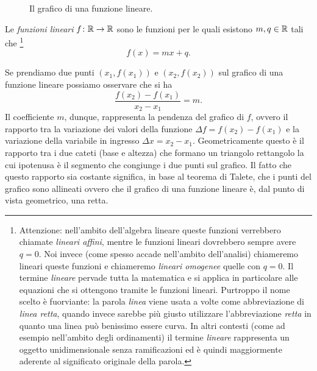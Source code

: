 \begin{figure}
  \begin{center}
  \end{center}
  \caption{Il grafico di una funzione lineare.}
  \label{fig:funzione_lineare}
\end{figure}

Le \emph{funzioni lineari}%
%
$f\colon {\mathbb R} \to {\mathbb R}$ sono le funzioni per le quali
esistono $m,q\in{\mathbb R}$ tali che%
\footnote{%
Attenzione: nell'ambito dell'algebra lineare queste
funzioni verrebbero chiamate \emph{lineari affini}, mentre
le funzioni lineari dovrebbero sempre avere $q=0$.
Noi invece (come spesso accade nell'ambito dell'analisi)
chiameremo lineari queste funzioni e chiameremo
\emph{lineari omogenee} quelle con $q=0$.
Il termine \emph{lineare} pervade tutta la matematica 
e si applica in particolare alle equazioni che si ottengono 
tramite le funzioni lineari.
Purtroppo il nome scelto è fuorviante: la parola \emph{linea} viene 
usata a volte come abbreviazione di \emph{linea retta}, quando 
invece sarebbe più giusto utilizzare l'abbreviazione \emph{retta}
in quanto una linea può benissimo essere curva.
In altri contesti (come ad esempio nell'ambito degli ordinamenti)
il termine \emph{lineare} rappresenta un oggetto unidimensionale
senza ramificazioni ed è quindi maggiormente aderente 
al significato originale della parola.
} %
\[
  f(x) = mx + q.
\]

Se prendiamo due punti $(x_1,f(x_1))$
e $(x_2,f(x_2))$ sul grafico di una funzione lineare
possiamo osservare che si ha
\[
  \frac{f(x_2) - f(x_1)}{x_2 - x_1} = m.
\]
Il coefficiente $m$, dunque, rappresenta la pendenza del
grafico di $f$, ovvero il rapporto tra la variazione
dei valori della funzione $\Delta f = f(x_2) - f(x_1)$
e la variazione della variabile in ingresso
$\Delta x = x_2 - x_1$.
Geometricamente questo è il rapporto tra i due cateti
(base e altezza) che formano un triangolo rettangolo la
cui ipotenusa è il segmento che congiunge i due punti sul grafico.
Il fatto che questo rapporto sia costante significa,
in base al teorema di Talete, che i punti del grafico sono
allineati ovvero che il grafico di una funzione lineare è,
dal punto di vista geometrico, una retta.

